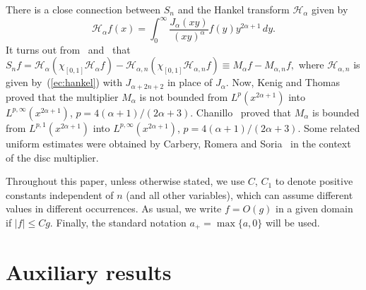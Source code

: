 \documentclass{amsart}
\theoremstyle{plain}
\begin{document}
There is a close connection between $S_n$ and the Hankel
transform ${\mathcal H}_\alpha$ given by
\begin{equation}
\label{ec:hankel}
   {\mathcal H}_\alpha f(x)
   = \int_0^\infty \frac{J_\alpha(xy)}{(xy)^\alpha} f(y) y^{2\alpha+1} \, dy.
\end{equation}
It turns out from~\cite[\S~5.1~(8), p.~134]{W} and~\cite[proof of Lemma
4]{CGPV} that
$
   S_n f = {\mathcal H}_\alpha(\chi_{[0,1]}{\mathcal H}_\alpha f)
   - {\mathcal H}_{\alpha,n}(\chi_{[0,1]}{\mathcal H}_{\alpha,n} f)
   \equiv M_\alpha f - M_{\alpha,n}f,
$
where ${\mathcal H}_{\alpha,n}$ is given by~(\ref{ec:hankel}) with
$J_{\alpha+2n+2}$ in place of $J_\alpha$. Now, Kenig and Thomas~\cite{KT}
proved that the multiplier $M_\alpha$ is not bounded from
$L^p(x^{2\alpha+1})$ into $L^{p,\infty}(x^{2\alpha+1})$, $p =
4(\alpha+1)/(2\alpha+3)$. Chanillo~\cite{Ch2} proved that $M_\alpha$ is
bounded from $L^{p,1}(x^{2\alpha+1})$ into $L^{p,\infty}(x^{2\alpha+1})$, $p
= 4(\alpha+1)/(2\alpha+3)$. Some related uniform estimates were obtained by
Carbery, Romera and Soria~\cite{RS, CRS} in the context of the disc
multiplier.

Throughout this paper, unless otherwise stated, we use $C$, $C_1$
to denote positive constants independent of $n$ (and all other variables),
which can assume different values in different occurrences. As usual, we
write $f = O(g)$ in a given domain if $|f| \leq C g$. Finally, the standard
notation $a_+ = \max\{a,0\}$ will be used.

\section{Auxiliary results}
\end{document}
